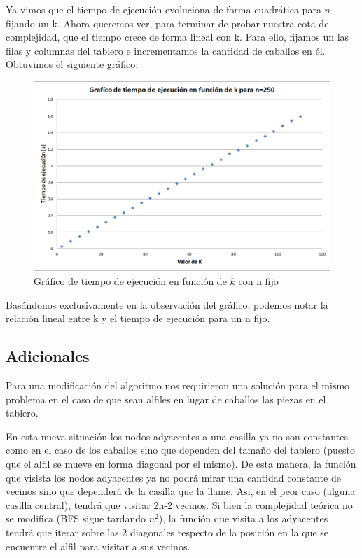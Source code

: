 \documentclass[11pt, a4paper, twoside]{article}
\begin{document}
Ya vimos que el tiempo de ejecución evoluciona de forma cuadrática para $n$ fijando un k. Ahora queremos ver, para terminar de probar nuestra cota de complejidad, que el tiempo crece de forma lineal con k. Para ello, fijamos un las filas y columnas del tablero e incrementamos la cantidad de caballos en él. Obtuvimos el siguiente gráfico:

\begin{figure}[H]
\centering
\includegraphics[scale=0.4]{imagenes/k.jpg}
\caption{Gráfico de tiempo de ejecución en función de $k$ con n fijo}
\end{figure} 

Basándonos exclusivamente en la observación del gráfico, podemos notar la relación lineal entre k y el tiempo de ejecución para un n fijo.

\subsection{Adicionales}

Para una modificación del algoritmo nos requirieron una solución para el mismo problema en el caso de que sean alfiles en lugar de caballos las piezas en el tablero.

En esta nueva situación los nodos adyacentes a una casilla ya no son constantes como en el caso de los caballos sino que dependen del tamaño del tablero (puesto que el alfil se mueve en forma diagonal por el mismo). De esta manera, la función que visista los nodos adyacentes ya no podrá mirar una cantidad constante de vecinos sino que dependerá de la casilla que la llame. Asi, en el peor caso (alguna casilla central), tendrá que visitar 2n-2 vecinos. Si bien la complejidad teórica no se modifica (BFS sigue tardando $n^2$), la función que visita a los adyacentes tendrá que iterar sobre las 2 diagonales respecto de la posición en la que se encuentre el alfil para visitar a sus vecinos.
\end{document}
